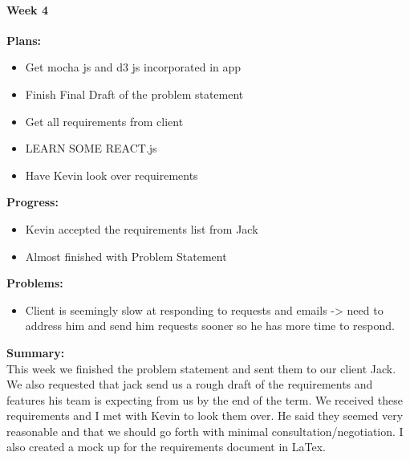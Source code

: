 \paragraph{Week 4}
\begin{adjustwidth}{2.5em}{0pt}
    \vspace{-0.5cm}\textbf{Plans:}
    \vspace{-0.5cm}
    \begin{itemize}
        \item Get mocha js and d3 js incorporated in app
        \item Finish Final Draft of the problem statement 
        \item Get all requirements from client
        \item LEARN SOME REACT.js
        \item Have Kevin look over requirements
    \end{itemize} 
    \vspace{-0.3cm}\textbf{Progress:}
    \vspace{-0.5cm}
    \begin{itemize}
        \item Kevin accepted the requirements list from Jack 
        \item Almost finished with Problem Statement
    \end{itemize} 
    \vspace{-0.3cm}\textbf{Problems:}
    \vspace{-0.5cm}
    \begin{itemize}
        \item Client is seemingly slow at responding to requests and emails -> need to address him and send him requests sooner so he has more time to respond.
    \end{itemize}  
    \vspace{-0.3cm}\noindent\textbf{Summary:}\\
    \noindent This week we finished the problem statement and sent them to our client Jack. We also requested that jack send us a rough draft of the requirements and features his team is expecting from us by the end of the term. We received these requirements and I met with Kevin to look them over. He said they seemed very reasonable and that we should go forth with minimal consultation/negotiation. I also created a mock up for the requirements document in LaTex.
\end{adjustwidth} 
